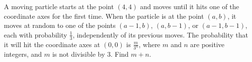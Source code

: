 A moving particle starts at the point $\left(4,4\right)$ and moves until it hits one of the coordinate axes for the first time. When the particle is at the point $\left(a,b\right)$, it moves at random to one of the points $\left(a-1,b\right)$, $\left(a,b-1\right)$, or $\left(a-1,b-1\right)$, each with probability $\frac{1}{3}$, independently of its previous moves. The probability that it will hit the coordinate axes at $\left(0,0\right)$ is $\frac{m}{3^n}$, where $m$ and $n$ are positive integers, and $m$ is not divisible by $3$. Find $m+n$.
